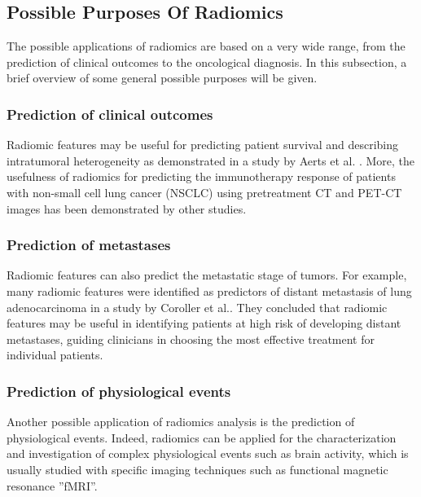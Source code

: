 \documentclass{standalone}
\begin{document}
\subsection{Possible Purposes Of Radiomics}

The possible applications of radiomics are based on a very wide range, from the prediction of clinical outcomes to the oncological diagnosis.
In this subsection, a brief overview of some general possible purposes will be given.
\subsubsection{Prediction of clinical outcomes} 
Radiomic features may be useful for predicting patient survival and describing intratumoral heterogeneity as demonstrated in a study by Aerts et al. \cite{Aerts}.
More, the usefulness of radiomics for predicting the immunotherapy response of patients with non-small cell lung cancer (NSCLC) using pretreatment CT and PET-CT images has been demonstrated by other studies\cite{tesicoppola}.
\subsubsection{Prediction of metastases}
Radiomic features can also predict the metastatic stage of tumors. 
For example, many radiomic features were identified as predictors of distant metastasis of lung adenocarcinoma in a study by Coroller et al.\cite{Coroller}.
They concluded that radiomic features may be useful in identifying patients at high risk of developing distant metastases, guiding clinicians in choosing the most effective treatment for individual patients.
\subsubsection{Prediction of physiological events}
Another possible application of radiomics analysis is the prediction of physiological events. 
Indeed, radiomics can be applied for the characterization and investigation of complex physiological events such as brain activity, which is usually studied with specific imaging techniques such as functional magnetic resonance ”fMRI”\cite{tesicoppola}. 
\end{document}
